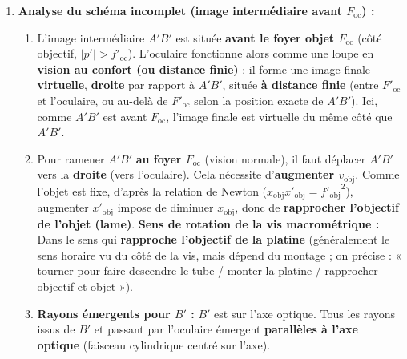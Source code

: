 \documentclass[11pt]{article}
\begin{document}
\begin{corrige}
\begin{enumerate}
    \begin{itemize}
        \item Espacement $300\,\text{nm} < \delta_{\text{min}} (516\,\text{nm})$ : \textbf{Non}, les deux globules ne sont pas résolus (image confondue).
        \item Espacement $800\,\text{nm} > \delta_{\text{min}} (516\,\text{nm})$ : \textbf{Oui}, les deux globules sont résolus (détails distincts).
    \end{itemize}
    \item \textbf{Analyse du schéma incomplet (image intermédiaire avant $F_{\text{oc}}$) :}
    \begin{enumerate}
        \item L'image intermédiaire $A'B'$ est située \textbf{avant le foyer objet $F_{\text{oc}}$} (côté objectif, $|p'| > f'_{\text{oc}}$). L'oculaire fonctionne alors comme une loupe en \textbf{vision au confort (ou distance finie)} : il forme une image finale \textbf{virtuelle}, \textbf{droite} par rapport à $A'B'$, située \textbf{à distance finie} (entre $F'_{\text{oc}}$ et l'oculaire, ou au-delà de $F'_{\text{oc}}$ selon la position exacte de $A'B'$). Ici, comme $A'B'$ est avant $F_{\text{oc}}$, l'image finale est virtuelle du même côté que $A'B'$.
        \item Pour ramener $A'B'$ \textbf{au foyer $F_{\text{oc}}$} (vision normale), il faut déplacer $A'B'$ vers la \textbf{droite} (vers l'oculaire). Cela nécessite d'\textbf{augmenter $v_{\text{obj}}$}. Comme l'objet est fixe, d'après la relation de Newton ($x_{\text{obj}} x'_{\text{obj}} = {f'_{\text{obj}}}^2$), augmenter $x'_{\text{obj}}$ impose de diminuer $x_{\text{obj}}$, donc de \textbf{rapprocher l'objectif de l'objet (lame)}.
        \textbf{Sens de rotation de la vis macrométrique :} Dans le sens qui \textbf{rapproche l'objectif de la platine} (généralement le sens horaire vu du côté de la vis, mais dépend du montage ; on précise : « tourner pour faire descendre le tube / monter la platine / rapprocher objectif et objet »).
        \item \textbf{Rayons émergents pour $B'$ :} $B'$ est sur l'axe optique. Tous les rayons issus de $B'$ et passant par l'oculaire émergent \textbf{parallèles à l'axe optique} (faisceau cylindrique centré sur l'axe).
    \end{enumerate}
\end{enumerate}
\end{corrige}

\newpage
\end{document}
